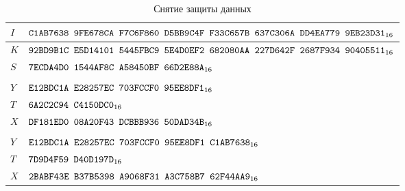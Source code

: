 \begin{table}[H]
\caption{Снятие защиты данных}\label{Table.TEST.AE.Unwrap}
\begin{tabular}{|l|l|}
\hline
$I$ & 
$\texttt{C1AB7638~9FE678CA~F7C6F860~D5BB9C4F~F33C657B~637C306A~DD4EA779~9EB23D31}_{16}$\\
\hline
$K$ & 
$\texttt{92BD9B1C~E5D14101~5445FBC9~5E4D0EF2~682080AA~227D642F~2687F934~90405511}_{16}$\\
\hline
$S$ & 
$\texttt{7ECDA4D0~1544AF8C~A58450BF~66D2E88A}_{16}$\\
\ddhline
\multicolumn{2}{|c|}{$\algname{belt-dwp}^{-1}$}\\
\hline
$Y$ &
$\texttt{E12BDC1A~E28257EC~703FCCF0~95EE8DF1}_{16}$\\
\hline
$T$ & 
$\texttt{6A2C2C94~C4150DC0}_{16}$\\
\dhline
$X$ &
$\texttt{DF181ED0~08A20F43~DCBBB936~50DAD34B}_{16}$\\
\ddhline
\multicolumn{2}{|c|}{$\algname{belt-che}^{-1}$}\\
\hline
$Y$ &
$\texttt{E12BDC1A~E28257EC~703FCCF0~95EE8DF1~C1AB7638}_{16}$\\
\hline
$T$ & 
$\texttt{7D9D4F59~D40D197D}_{16}$\\
\dhline
$X$ &
$\texttt{2BABF43E~B37B5398~A9068F31~A3C758B7~62F44AA9}_{16}$\\
\hline
\end{tabular}
\end{table}
